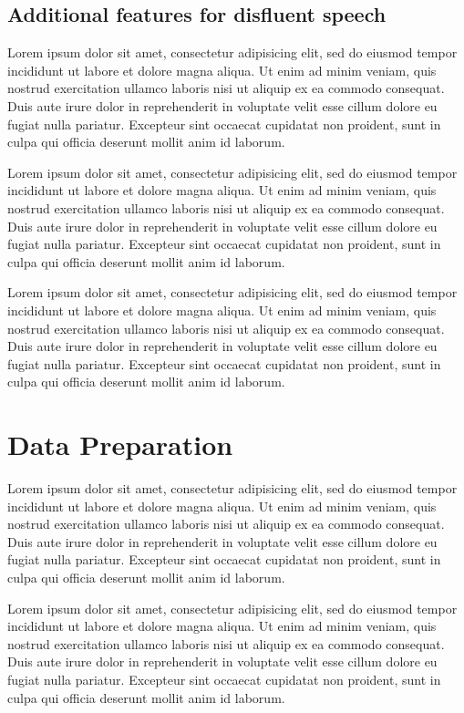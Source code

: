 \documentclass[11pt,letterpaper]{article}
\begin{document}
\subsection{Additional features for disfluent speech}

Lorem ipsum dolor sit amet, consectetur adipisicing elit, sed do eiusmod tempor incididunt ut labore et dolore magna aliqua. Ut enim ad minim veniam, quis nostrud exercitation ullamco laboris nisi ut aliquip ex ea commodo consequat. Duis aute irure dolor in reprehenderit in voluptate velit esse cillum dolore eu fugiat nulla pariatur. Excepteur sint occaecat cupidatat non proident, sunt in culpa qui officia deserunt mollit anim id laborum.

Lorem ipsum dolor sit amet, consectetur adipisicing elit, sed do eiusmod tempor incididunt ut labore et dolore magna aliqua. Ut enim ad minim veniam, quis nostrud exercitation ullamco laboris nisi ut aliquip ex ea commodo consequat. Duis aute irure dolor in reprehenderit in voluptate velit esse cillum dolore eu fugiat nulla pariatur. Excepteur sint occaecat cupidatat non proident, sunt in culpa qui officia deserunt mollit anim id laborum.

Lorem ipsum dolor sit amet, consectetur adipisicing elit, sed do eiusmod tempor incididunt ut labore et dolore magna aliqua. Ut enim ad minim veniam, quis nostrud exercitation ullamco laboris nisi ut aliquip ex ea commodo consequat. Duis aute irure dolor in reprehenderit in voluptate velit esse cillum dolore eu fugiat nulla pariatur. Excepteur sint occaecat cupidatat non proident, sunt in culpa qui officia deserunt mollit anim id laborum.

\section{Data Preparation}


Lorem ipsum dolor sit amet, consectetur adipisicing elit, sed do eiusmod tempor incididunt ut labore et dolore magna aliqua. Ut enim ad minim veniam, quis nostrud exercitation ullamco laboris nisi ut aliquip ex ea commodo consequat. Duis aute irure dolor in reprehenderit in voluptate velit esse cillum dolore eu fugiat nulla pariatur. Excepteur sint occaecat cupidatat non proident, sunt in culpa qui officia deserunt mollit anim id laborum.

Lorem ipsum dolor sit amet, consectetur adipisicing elit, sed do eiusmod tempor incididunt ut labore et dolore magna aliqua. Ut enim ad minim veniam, quis nostrud exercitation ullamco laboris nisi ut aliquip ex ea commodo consequat. Duis aute irure dolor in reprehenderit in voluptate velit esse cillum dolore eu fugiat nulla pariatur. Excepteur sint occaecat cupidatat non proident, sunt in culpa qui officia deserunt mollit anim id laborum.
\end{document}

